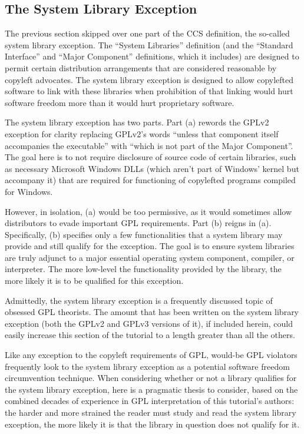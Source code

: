 \subsection{The System Library Exception}
\label{GPLv3-system-library-exception}

The previous section skipped over one part of the CCS definition, the
so-called system library exception.  The ``System Libraries'' definition (and
the ``Standard Interface'' and ``Major Component'' definitions, which it
includes) are designed
to permit certain distribution arrangements that are considered reasonable by
copyleft advocates.  The system library exception is designed to allow
copylefted software to link with these libraries when prohibition of that linking would hurt
software freedom more than it would hurt proprietary software.

The system library exception has two parts.  Part (a) rewords the GPLv2
exception for clarity replacing GPLv2's words ``unless that component itself
accompanies the executable'' with ``which is not part of the Major
Component''.  The goal here is to not require disclosure of source code of
certain libraries, such as necessary Microsoft Windows DLLs (which aren't
part of Windows' kernel but accompany it) that are required for functioning
of copylefted programs compiled for Windows.

However, in isolation, (a) would be too permissive, as it would sometimes
allow distributors to evade important GPL requirements.  Part (b) reigns
in (a).  Specifically, (b) specifies only a few functionalities that a
system library may provide and still qualify for the exception.  The goal is
to ensure system libraries are truly adjunct to a major essential operating
system component, compiler, or interpreter.  The more low-level the
functionality provided by the library, the more likely it is to be qualified
for this exception.

Admittedly, the system library exception is a frequently discussed topic of
obsessed GPL theorists.  The amount that has been written on the system
library exception (both the GPLv2 and GPLv3 versions of it), if included
herein,  could easily increase this section of the tutorial to a length
greater than all the others.

Like any exception to the copyleft requirements of GPL, would-be GPL
violators frequently look to the system library exception as a potential
software freedom circumvention technique.  When considering whether or not a
library qualifies for the system library exception, here is a pragmatic
thesis to consider, based on the combined decades of experience in GPL
interpretation of this tutorial's authors: the harder and more strained the
reader must study and read the system library exception, the more likely it
is that the library in question does not qualify for it.


